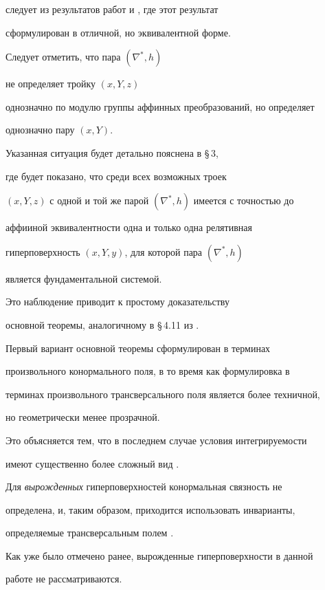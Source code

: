 следует из результатов работ \cite{IVA} и \cite{OPO}, где этот результат


сформулирован в отличной, но эквивалентной форме.


Следует отметить, что пара $(\nabla^*, h)$


не определяет тройку $(x,Y,z)$


однозначно по модулю группы аффинных преобразований, но определяет


однозначно пару $(x, Y)$.


Указанная ситуация будет детально пояснена в \S\,3,


где будет показано, что среди всех возможных троек


$(x,Y,z)$ с одной и той же парой $(\nabla^*,h)$ имеется с точностью до


аффииной эквивалентности одна и только одна релятивная


гиперповерхность $(x,Y,y)$, для которой пара $(\nabla^*, h)$


является фундаментальной системой.


Это наблюдение приводит к простому доказательству 


основной теоремы, аналогичному в \S\,4.11 из \cite{SIM-S-V}.





Первый вариант основной теоремы сформулирован в терминах


произвольного конормального поля, в то время как формулировка в


терминах произвольного трансверсального поля является более техничной,


но геометрически менее прозрачной.


Это объясняется тем, что в последнем случае условия интегрируемости


имеют существенно более сложный вид \cite{IVA}.


Для {\it вырожденных} гиперповерхностей конормальная связность не


определена, и, таким образом, приходится использовать инварианты,


определяемые трансверсальным полем \cite{OPO}.


Как уже было отмечено ранее, вырожденные гиперповерхности в данной


работе не рассматриваются.


\medskip





